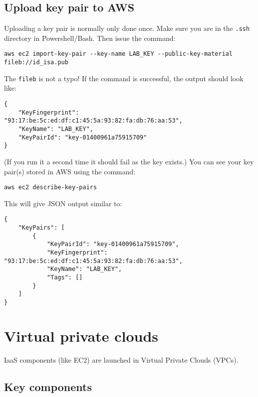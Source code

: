\documentclass{pgnotes}
\begin{document}
\subsection{Upload key pair to AWS}
\label{sec:upload-key-pair-to-aws}

Uploading a key pair is normally only done once.
Make sure you are in the \texttt{.ssh} directory in Powershell/Bash.
Then issue the command: 
\begin{verbatim}
aws ec2 import-key-pair --key-name LAB_KEY --public-key-material fileb://id_isa.pub
\end{verbatim}
The \texttt{fileb} is not a typo!
If the command is successful, the output should look like: 
\begin{verbatim}
{
    "KeyFingerprint": "93:17:be:5c:ed:df:c1:45:5a:93:82:fa:db:76:aa:53",
    "KeyName": "LAB_KEY",
    "KeyPairId": "key-01400961a75915709"
}
\end{verbatim}
(If you run it a second time it should fail as the key exists.)
You can see your key pair(s) stored in AWS using the command:
\begin{verbatim}
aws ec2 describe-key-pairs
\end{verbatim}
This will give JSON output similar to: 
\begin{verbatim}
{
    "KeyPairs": [
        {
            "KeyPairId": "key-01400961a75915709",
            "KeyFingerprint": "93:17:be:5c:ed:df:c1:45:5a:93:82:fa:db:76:aa:53",
            "KeyName": "LAB_KEY",
            "Tags": []
        }
    ]
}
\end{verbatim}



\section{Virtual private clouds}

IaaS components (like EC2) are launched in Virtual Private Clouds (VPCs).


\subsection{Key components}
\end{document}
